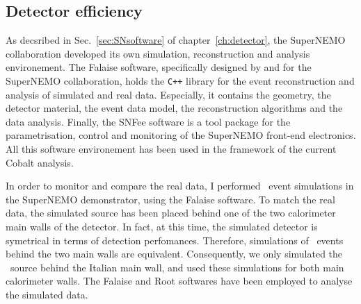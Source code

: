 \subsection{Detector efficiency}

As decsribed in Sec.~\ref{sec:SNsoftware} of chapter~\ref{ch:detector}, the SuperNEMO collaboration developed its own simulation, reconstruction and analysis environement.
The Falaise software, specifically designed by and for the SuperNEMO collaboration, holds the \verb!C++! library for the event reconstruction and analysis of simulated and real data.
Especially, it contains the geometry, the detector material, the event data model, the reconstruction algorithms and the data analysis.
Finally, the SNFee software is a tool package for the parametrisation, control and monitoring of the SuperNEMO front-end electronics.
All this software environement has been used in the framework of the current Cobalt analysis.

In order to monitor and compare the real data, I performed \Co\ event simulations in the SuperNEMO demonstrator, using the Falaise software.
To match the real data, the simulated source has been placed behind one of the two calorimeter main walls of the detector.
In fact, at this time, the simulated detector is symetrical in terms of detection perfomances.
Therefore, simulations of \Co\ events behind the two main walls are equivalent.
Consequently, we only simulated the \Co\ source behind the Italian main wall, and used these simulations for both main calorimeter walls.
The Falaise and Root softwares have been employed to analyse the simulated data.

